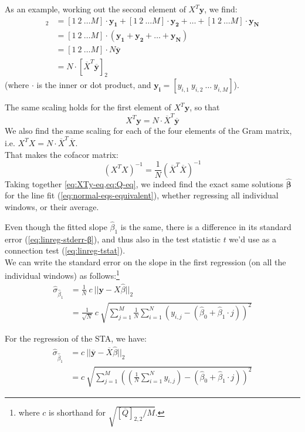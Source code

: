 As an example, working out the second element of $X^T \bm{y}$, we find:
\begin{align}
    [X^T \bm{y}]_2
    &= [1\ 2\ … M] · \bm{y_1} + [1\ 2\ … M] · \bm{y_2} + … + [1\ 2\ … M] · \bm{y_N}  \nonumber \\
    &= [1\ 2\ … M] · (\bm{y_1} + \bm{y_2} + … + \bm{y_N})   \nonumber \\
    &= [1\ 2\ … M] · N \overline{\bm{y}}   \nonumber \\
    &= N · [\overline{X}^T \overline{\bm{y}}]_2
\end{align}
(where $·$ is the inner or dot product, and $\bm{y_i} = [y_{i,1}\ y_{i,2}\ …\ y_{i,M}]$).

The same scaling holds for the first element of $X^T \bm{y}$, so that
\begin{equation} \label{eq:XTy-eq}
    X^T \bm{y} = N · \overline{X}^T \overline{\bm{y}}
\end{equation}
We also find the same scaling for each of the four elements of the Gram matrix, i.e. $X^T X = N · \overline{X}^T \overline{X}$.\\
That makes the cofacor matrix:
\begin{equation} \label{eq:Q-eq}
    (X^T X)^{-1} = \frac{1}{N} (\overline{X}^T \overline{X})^{-1}
\end{equation}
Taking together \cref{eq:XTy-eq,eq:Q-eq}, we indeed find the exact same solutions $\hat{\bm{β}}$ for the line fit (\cref{eq:normal-eqs-equivalent}), whether regressing all individual windows, or their average.

Even though the fitted slope $\hat{β}_1$ is the same, there is a difference in its standard error (\cref{eq:linreg-stderr-β}), and thus also in the test statistic $t$ we'd use as a connection test (\cref{eq:linreg-tstat}).\\
We can write the standard error on the slope in the first regression (on all the individual windows) as follows:\footnote{
    where $c$ is shorthand for $\sqrt{\left[\overline{Q}\right]_{2,2} / M}$.
}
\begin{align}
    \hat{σ}_{\hat{β}_1}
    &= \frac{1}{N}\ c\ || \bm{y} - X \hat{β} ||_2  \\
    &= \frac{1}{\sqrt{N}}\ c\ \sqrt{\sum_{j=1}^M \frac{1}{N}\sum_{i=1}^N
    \left( y_{i,j} - (\hat{β}_0 + \hat{β}_1 · j)  \right)^2 }  \label{eq:stderr-wins}
\end{align}

For the regression of the STA, we have:
\begin{align}
    \hat{σ}_{\hat{\overline{β}}_1}
    &= c\ || \overline{\bm{y}} - \overline{X} \hat{β} || _2 \\
    &=  c\ \sqrt{\sum_{j=1}^M \left(
        \left(\frac{1}{N}\sum_{i=1}^N y_{i,j}\right)
        - (\hat{β}_0 + \hat{β}_1 · j)  \right)^2 }   \label{eq:stderr-STA}
\end{align}

